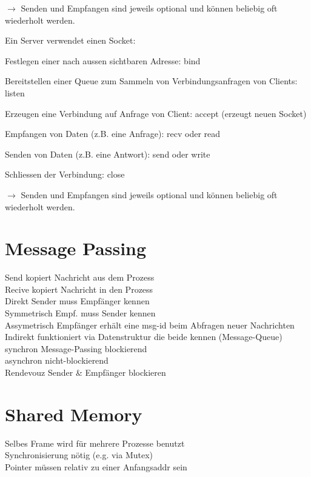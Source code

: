 \begin{multicols*}{5}
	$\rightarrow$ Senden und Empfangen sind jeweils optional und können beliebig oft wiederholt werden.

Ein \textcolor{h}{Server verwendet einen Socket}:
\begin{compactenum}[1.]
	\item Festlegen einer nach aussen sichtbaren Adresse: bind
	\item Bereitstellen einer Queue zum Sammeln von Verbindungsanfragen von Clients: listen 
	\item Erzeugen eine Verbindung auf Anfrage von Client: accept (erzeugt neuen Socket) 
	\item Empfangen von Daten (z.B. eine Anfrage): recv oder read 
	\item Senden von Daten (z.B. eine Antwort): send oder write 
	\item Schliessen der Verbindung: close
\end{compactenum}
	$\rightarrow$	Senden und Empfangen sind jeweils optional und können beliebig oft wiederholt werden.



\section{Message Passing}

\textcolor{h}{Send} kopiert Nachricht aus dem Prozess\\
\textcolor{h}{Recive} kopiert Nachricht in den Prozess\\
\textcolor{h}{Direkt} Sender muss Empfänger kennen\\
\textcolor{h}{Symmetrisch} Empf. muss Sender kennen\\
\textcolor{h}{Assymetrisch} Empfänger erhält eine msg-id beim Abfragen neuer Nachrichten\\
\textcolor{h}{Indirekt} funktioniert via Datenstruktur die beide kennen (Message-Queue)\\
\textcolor{h}{synchron} Message-Passing blockierend\\
\textcolor{h}{asynchron} nicht-blockierend \\
\textcolor{h}{Rendevouz} Sender \& Empfänger blockieren

\vspace{-7pt}

\section{Shared Memory}
\textcolor{h}{Selbes Frame} wird für mehrere Prozesse benutzt\\
\textcolor{h}{Synchronisierung} nötig (e.g. via Mutex)\\
\textcolor{h}{Pointer} müssen relativ zu einer Anfangsaddr sein




\end{multicols*}
